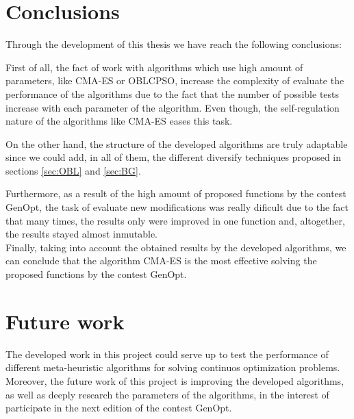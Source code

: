 
\section{Conclusions}

Through the development of this thesis we have reach the following conclusions: 

First of all, the fact of work with algorithms which use high amount of parameters, like CMA-ES or OBLCPSO, increase the complexity of evaluate the performance of the algorithms due to the fact that the number of possible tests increase with each parameter of the algorithm. Even though, the self-regulation nature of the algorithms like CMA-ES eases this task.

On the other hand, the structure of the developed algorithms are truly adaptable since we could add, in all of them, the different diversify techniques proposed in sections \ref{sec:OBL} and \ref{sec:BG}.

Furthermore, as a result of the high amount of proposed functions by the contest GenOpt, the task of evaluate new modifications was really dificult due to the fact that many times, the results only were improved in one function and, altogether, the results stayed almost inmutable. \\

Finally, taking into account the obtained results by the developed algorithms, we can conclude that the algorithm CMA-ES is the most effective solving the proposed functions by the contest GenOpt.



\section{Future work}

The developed work in this project could serve up to test the performance of different meta-heuristic algorithms for solving continuos optimization problems.\\

Moreover, the future work of this project is improving the developed algorithms, as well as deeply research the parameters of the algorithms, in the interest of participate in the next edition of the contest GenOpt.  
